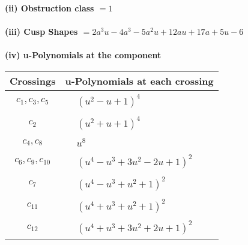 \documentclass[1p]{elsarticle_modified}
\theoremstyle{definition}
\begin{document}
\flushleft \textbf{(ii) Obstruction class $= 1$}\\~\\
\flushleft \textbf{(iii) Cusp Shapes $= 2 a^3 u-4 a^3-5 a^2 u+12 a u+17 a+5 u-6$}\\~\\
\newpage\renewcommand{\arraystretch}{1}
\flushleft \textbf{(iv) u-Polynomials at the component}\newline \\
\begin{tabular}{m{50pt}|m{274pt}}
Crossings & \hspace{64pt}u-Polynomials at each crossing \\
\hline $$\begin{aligned}c_{1},c_{3},c_{5}\end{aligned}$$&$\begin{aligned}
&(u^2- u+1)^4
\end{aligned}$\\
\hline $$\begin{aligned}c_{2}\end{aligned}$$&$\begin{aligned}
&(u^2+u+1)^4
\end{aligned}$\\
\hline $$\begin{aligned}c_{4},c_{8}\end{aligned}$$&$\begin{aligned}
&u^8
\end{aligned}$\\
\hline $$\begin{aligned}c_{6},c_{9},c_{10}\end{aligned}$$&$\begin{aligned}
&(u^4- u^3+3 u^2-2 u+1)^2
\end{aligned}$\\
\hline $$\begin{aligned}c_{7}\end{aligned}$$&$\begin{aligned}
&(u^4- u^3+u^2+1)^2
\end{aligned}$\\
\hline $$\begin{aligned}c_{11}\end{aligned}$$&$\begin{aligned}
&(u^4+u^3+u^2+1)^2
\end{aligned}$\\
\hline $$\begin{aligned}c_{12}\end{aligned}$$&$\begin{aligned}
&(u^4+u^3+3 u^2+2 u+1)^2
\end{aligned}$\\
\hline
\end{tabular}\\~\\
\end{document}
